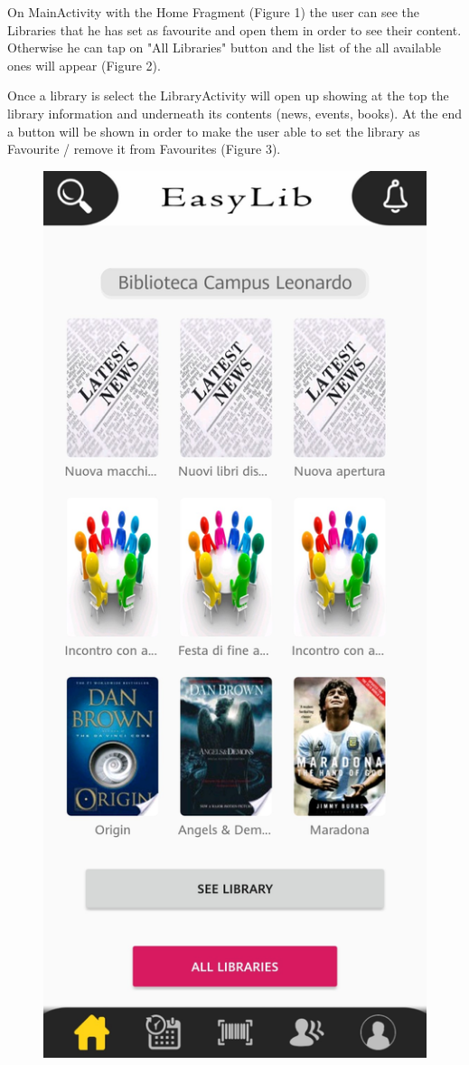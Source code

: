 \vspace{3mm}
On MainActivity with the Home Fragment (Figure 1) the user can see the Libraries that he has set as favourite and open them in order to see their content. Otherwise he can tap on "All Libraries" button and the list of the all available ones will appear (Figure 2).\par
Once a library is select the LibraryActivity will open up showing at the top the library information and underneath its contents (news, events, books). At the end a button will be shown in order to make the user able to set the library as Favourite / remove it from Favourites (Figure 3).
\begin{figure}[H]
	\centering
	\includegraphics[scale=0.15]{Images/UI/Libraries/1}

\end{figure}
